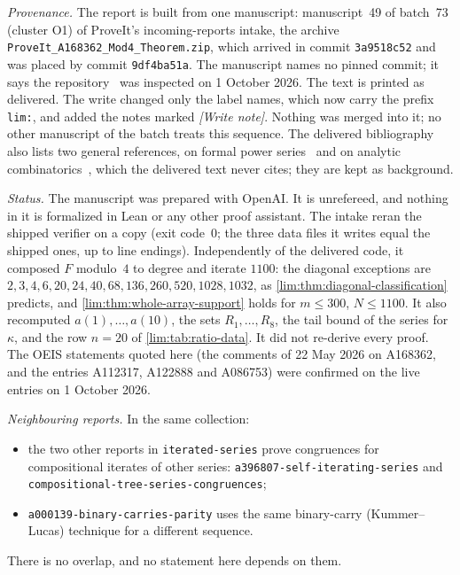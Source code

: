 \documentclass[11pt]{article}
\theoremstyle{definition}
\theoremstyle{remark}
\begin{document}
\emph{Provenance.} The report is built from one manuscript: manuscript~49
of batch~73 (cluster O1) of ProveIt's incoming-reports intake, the archive
\texttt{ProveIt\_A168362\_Mod4\_Theorem.zip}, which arrived in commit
\texttt{3a9518c52} and was placed by commit \texttt{9df4ba51a}. The
manuscript names no pinned commit; it says the repository~\cite{ProveIt}
was inspected on 1 October 2026. The text is printed as delivered. The
write changed only the label names, which now carry the prefix
\texttt{lim:}, and added the notes marked \emph{[Write note]}. Nothing was
merged into it; no other manuscript of the batch treats this sequence.
The delivered bibliography also lists two general references, on formal
power series~\cite{StanleyEC1} and on analytic
combinatorics~\cite{FlajoletSedgewick}, which the delivered text never
cites; they are kept as background.

\emph{Status.} The manuscript was prepared with OpenAI. It is unrefereed,
and nothing in it is formalized in Lean or any other proof assistant. The
intake reran the shipped verifier on a copy (exit code~0; the three data
files it writes equal the shipped ones, up to line endings). Independently
of the delivered code, it composed $F$ modulo~$4$ to degree and iterate
$1100$: the diagonal exceptions are $2,3,4,6,20,24,40,68,136,260,520,1028,1032$,
as \cref{lim:thm:diagonal-classification} predicts, and
\cref{lim:thm:whole-array-support} holds for $m\le300$, $N\le1100$. It
also recomputed $a(1),\ldots,a(10)$, the sets $R_1,\ldots,R_8$, the tail
bound of the series for $\kappa$, and the row $n=20$ of
\cref{lim:tab:ratio-data}. It did not re-derive every proof. The OEIS
statements quoted here (the comments of 22 May 2026 on A168362, and the
entries A112317, A122888 and A086753) were confirmed on the live entries on
1 October 2026.

\emph{Neighbouring reports.} In the same collection:
\begin{itemize}
\item the two other reports in \texttt{iterated-series} prove congruences
  for compositional iterates of other series:\newline
  \texttt{a396807-self-iterating-series} and\newline
  \texttt{compositional-tree-series-congruences};
\item \texttt{a000139-binary-carries-parity} uses the same binary-carry
  (Kummer--Lucas) technique for a different sequence.
\end{itemize}
There is no overlap, and no statement here depends on them.
\end{document}
